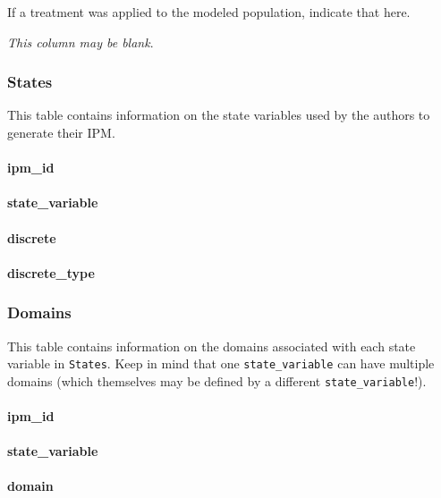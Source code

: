 \documentclass[]{article}
\let\oldparagraph\paragraph
\renewcommand{\paragraph}[1]{\oldparagraph{#1}\mbox{}}
\begin{document}
If a treatment was applied to the modeled population, indicate that
here.

\emph{This column may be blank}.

\subsubsection{States}\label{states}

This table contains information on the state variables used by the
authors to generate their IPM.

\paragraph{ipm\_id}\label{ipm_id-1}

\paragraph{state\_variable}\label{state_variable}

\paragraph{discrete}\label{discrete}

\paragraph{discrete\_type}\label{discrete_type}

\subsubsection{Domains}\label{domains}

This table contains information on the domains associated with each
state variable in \texttt{States}. Keep in mind that one
\texttt{state\_variable} can have multiple domains (which themselves may
be defined by a different \texttt{state\_variable}!).

\paragraph{ipm\_id}\label{ipm_id-2}

\paragraph{state\_variable}\label{state_variable-1}

\paragraph{domain}\label{domain}
\end{document}
